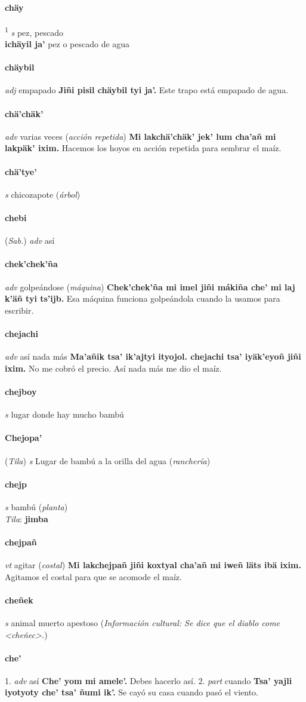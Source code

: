 \documentclass{scrbook}
\newcommand{\entry}[1]{\paragraph{#1}}
\newcommand{\onedefinition}[1]{#1.}
\newcommand{\defsuperscript}[1]{\textsuperscript{1}}
\newcommand{\partofspeech}[1]{\textit{#1}}
\newcommand{\spanishtranslation}[1]{#1}
\newcommand{\clarification}[1]{(\textit{#1})}
\newcommand{\cholexample}[1]{\textbf{#1}}
\newcommand{\exampletranslation}[1]{#1}
\newcommand{\dialectvariant}[1]{\\\textit{#1}:}
\newcommand{\dialectword}[1]{\textbf{#1}}
\newcommand{\relevantdialect}[1]{(\textit{#1})}
\newcommand{\culturalinformation}[1]{(\textit{#1})}
\newcommand{\secondaryentry}[1]{\\\textbf{#1}}
\newcommand{\secondtranslation}[1]{#1}
\begin{document}
\begin{multicols}{2}
\entry{chäy}
\defsuperscript{2}
\partofspeech{s}
\spanishtranslation{pez, pescado}
\secondaryentry{ichäyil ja'}
\secondtranslation{pez o pescado de agua}

\entry{chäybil}
\partofspeech{adj}
\spanishtranslation{empapado}
\cholexample{Jiñi pisil chäybil tyi ja'.}
\exampletranslation{Este trapo está empapado de agua.}

\entry{chä'chäk'}
\partofspeech{adv}
\spanishtranslation{varias veces}
\clarification{acción repetida}
\cholexample{Mi lakchä'chäk' jek' lum cha'añ mi lakpäk' ixim.}
\exampletranslation{Hacemos los hoyos en acción repetida para sembrar el maíz.}

\entry{chä'tye'}
\partofspeech{s}
\spanishtranslation{chicozapote}
\clarification{árbol}

\entry{chebi}
\relevantdialect{Sab.}
\partofspeech{adv}
\spanishtranslation{así}

\entry{chek'chek'ña}
\partofspeech{adv}
\spanishtranslation{golpeándose}
\clarification{máquina}
\cholexample{Chek'chek'ña mi imel jiñi mákiña che' mi laj k'äñ tyi ts'ijb.}
\exampletranslation{Esa máquina funciona golpeándola cuando la usamos para escribir.}

\entry{chejachi}
\partofspeech{adv}
\spanishtranslation{así nada más}
\cholexample{Ma'añik tsa' ik'ajtyi ityojol. chejachi tsa' iyäk'eyoñ jiñi ixim.}
\exampletranslation{No me cobró el precio. Así nada más me dio el maíz.}

\entry{chejboy}
\partofspeech{s}
\spanishtranslation{lugar donde hay mucho bambú}

\entry{Chejopa'}
\relevantdialect{Tila}
\partofspeech{s}
\spanishtranslation{Lugar de bambú a la orilla del agua}
\clarification{ranchería}

\entry{chejp}
\partofspeech{s}
\spanishtranslation{bambú}
\clarification{planta}
\dialectvariant{Tila}
\dialectword{jimba}

\entry{chejpañ}
\partofspeech{vt}
\spanishtranslation{agitar}
\clarification{costal}
\cholexample{Mi lakchejpañ jiñi koxtyal cha'añ mi iweñ läts ibä ixim.}
\exampletranslation{Agitamos el costal para que se acomode el maíz.}

\entry{cheñek}
\partofspeech{s}
\spanishtranslation{animal muerto apestoso}
\culturalinformation{Información cultural: Se dice que el diablo come <cheñec>.}

\entry{che'}
\onedefinition{1}
\partofspeech{adv}
\spanishtranslation{así}
\cholexample{Che' yom mi amele'.}
\exampletranslation{Debes hacerlo así.}
\onedefinition{2}
\partofspeech{part}
\spanishtranslation{cuando}
\cholexample{Tsa' yajli iyotyoty che' tsa' ñumi ik'.}
\exampletranslation{Se cayó su casa cuando pasó el viento.}


\end{multicols}
\end{document}
